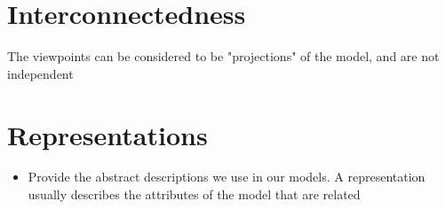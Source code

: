 \documentclass{article}[18pt]
\begin{document}
\section{Interconnectedness}
The viewpoints can be considered to be "projections" of the model, and are not independent
\section{Representations}
\begin{itemize}
	\item Provide the abstract descriptions we use in our models. A representation usually describes the attributes of the model that are related
\end{itemize}
\end{document}
